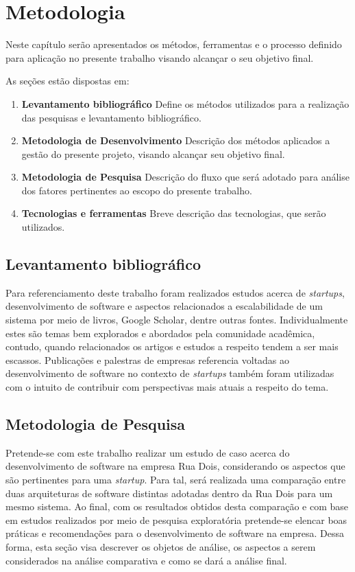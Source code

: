 \chapter{Metodologia}
\label{sec:Metodologia}

Neste capítulo serão apresentados os métodos, ferramentas e o processo definido
para aplicação no presente trabalho visando alcançar o seu objetivo final.

  As seções estão dispostas em:

  \begin{enumerate}
    \item \textbf{Levantamento bibliográfico} Define os métodos utilizados para
    a realização das pesquisas e levantamento bibliográfico.
    \item \textbf{Metodologia de Desenvolvimento} Descrição dos métodos
    aplicados a gestão do presente projeto, visando alcançar seu objetivo final.
    \item \textbf{Metodologia de Pesquisa} Descrição do fluxo que será
    adotado para análise dos fatores pertinentes ao escopo do presente trabalho.
    \item \textbf{Tecnologias e ferramentas} Breve descrição das tecnologias,
    que serão utilizados.
  \end{enumerate}

\section{Levantamento bibliográfico}

Para referenciamento deste trabalho foram realizados estudos acerca de
\textit{startups}, desenvolvimento de software e aspectos relacionados
a escalabilidade de um sistema por meio de livros, Google Scholar, dentre
outras fontes. Individualmente estes são temas bem explorados e abordados
pela comunidade acadêmica, contudo, quando relacionados os artigos e estudos
a respeito tendem a ser mais escassos. Publicações e palestras de empresas
referencia voltadas ao desenvolvimento de software no contexto de
\textit{startups} também foram utilizadas com o intuito de contribuir com
perspectivas mais atuais a respeito do tema.

\section{Metodologia de Pesquisa}
\label{sec:MetodologiaPesquisa}

Pretende-se com este trabalho realizar um estudo de caso acerca do desenvolvimento
de software na empresa Rua Dois, considerando os aspectos que são pertinentes para
uma \textit{startup}. Para tal, será realizada uma comparação entre duas arquiteturas
de software distintas adotadas dentro da Rua Dois para um mesmo sistema. Ao final,
com os resultados obtidos desta comparação e com base em estudos realizados por meio
de pesquisa exploratória pretende-se elencar boas práticas e recomendações para o
desenvolvimento de software na empresa. Dessa forma, esta seção visa descrever
os objetos de análise, os aspectos a serem considerados na análise comparativa e
como se dará a análise final.

